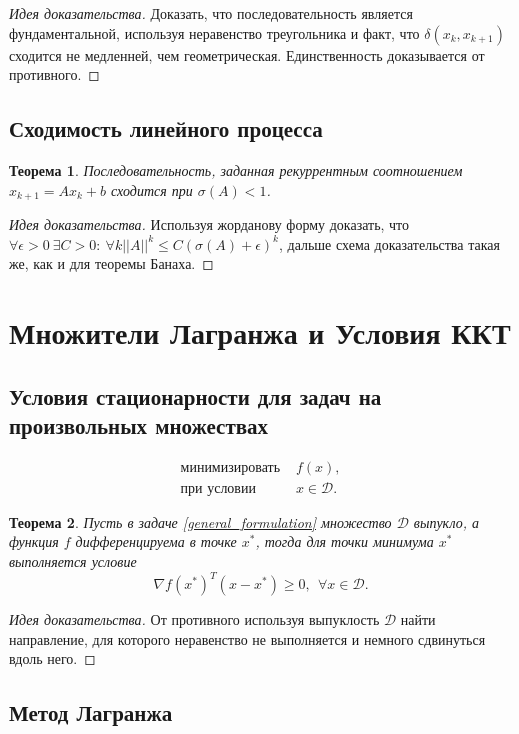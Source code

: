 \documentclass[10pt,a4paper]{article}
\newtheorem{theorem_ru}{Теорема}[section]
\newenvironment{sketch}
    {\begin{proof}[Идея доказательства]
    }
    { 
    \end{proof}
    }
\begin{document}
\begin{sketch}
Доказать, что последовательность является фундаментальной, используя неравенство треугольника и факт, что $\delta(x_k, x_{k+1})$ сходится не медленней, чем геометрическая. Единственность доказывается от противного.	
\end{sketch}

\subsection{Сходимость линейного процесса}
\begin{theorem_ru}
Последовательность, заданная рекуррентным соотношением $x_{k+1}=Ax_k+b$ сходится при $\sigma(A)<1$.
\end{theorem_ru}
\begin{sketch}
Используя жорданову форму доказать, что $\forall \epsilon>0~\exists C>0:~\forall k ||A||^k\leq C(\sigma(A)+\epsilon)^k$, дальше схема доказательства такая же, как и для теоремы Банаха.
\end{sketch}

\section{Множители Лагранжа и Условия ККТ}
\subsection{Условия стационарности для задач на произвольных множествах}
\begin{equation}\label{general_formulation}
\begin{array}{ll}
\mbox{минимизировать } & f(x),\\
\mbox{при условии } & x\in \mathcal{D}.
\end{array}
\end{equation}

\begin{theorem_ru}
Пусть в задаче \eqref{general_formulation} множество $\mathcal{D}$ выпукло, а функция $f$ дифференцируема в точке $x^*$, тогда для точки минимума $x^*$ выполняется условие
$$
\nabla f(x^*)^T(x-x^*)\geq 0,~~\forall x\in \mathcal{D}.
$$
\end{theorem_ru}
\begin{sketch}
От противного используя выпуклость $\mathcal{D}$ найти направление, для которого неравенство не выполняется и немного сдвинуться вдоль него.
\end{sketch}

\subsection{Метод Лагранжа}
\end{document}
